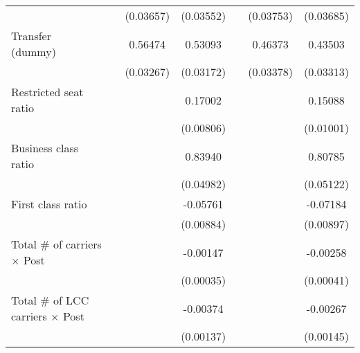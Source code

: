 \begin{table}[htbp]
\begin{tabular}{l*{6}{c}}
                    &                     &   (0.03657)         &   (0.03552)         &                     &   (0.03753)         &   (0.03685)         \\
\addlinespace
\shortstack{Transfer \\ (dummy)}&                     &     0.56474\sym{***}&     0.53093\sym{***}&                     &     0.46373\sym{***}&     0.43503\sym{***}\\
                    &                     &   (0.03267)         &   (0.03172)         &                     &   (0.03378)         &   (0.03313)         \\
\addlinespace
Restricted seat ratio&                     &                     &     0.17002\sym{***}&                     &                     &     0.15088\sym{***}\\
                    &                     &                     &   (0.00806)         &                     &                     &   (0.01001)         \\
\addlinespace
Business class ratio&                     &                     &     0.83940\sym{***}&                     &                     &     0.80785\sym{***}\\
                    &                     &                     &   (0.04982)         &                     &                     &   (0.05122)         \\
\addlinespace
First class ratio   &                     &                     &    -0.05761\sym{***}&                     &                     &    -0.07184\sym{***}\\
                    &                     &                     &   (0.00884)         &                     &                     &   (0.00897)         \\
\addlinespace
Total # of carriers $\times$ Post&                     &                     &    -0.00147\sym{***}&                     &                     &    -0.00258\sym{***}\\
                    &                     &                     &   (0.00035)         &                     &                     &   (0.00041)         \\
\addlinespace
Total # of LCC carriers $\times$ Post&                     &                     &    -0.00374\sym{***}&                     &                     &    -0.00267\sym{*}  \\
                    &                     &                     &   (0.00137)         &                     &                     &   (0.00145)         \\

\end{tabular}
\end{table}
